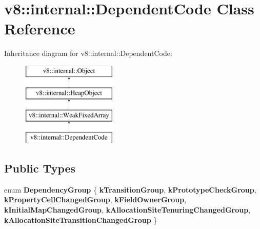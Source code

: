 \hypertarget{classv8_1_1internal_1_1DependentCode}{}\section{v8\+:\+:internal\+:\+:Dependent\+Code Class Reference}
\label{classv8_1_1internal_1_1DependentCode}
Inheritance diagram for v8\+:\+:internal\+:\+:Dependent\+Code\+:\begin{figure}[H]
\begin{center}
\leavevmode
\includegraphics[height=4.000000cm]{classv8_1_1internal_1_1DependentCode}
\end{center}
\end{figure}
\subsection*{Public Types}
\begin{DoxyCompactItemize}
\item 
\mbox{\label{classv8_1_1internal_1_1DependentCode_a6ddeb27b4e6f458ce2257036e3f364ae}} 
enum {\bfseries Dependency\+Group} \{ \newline
{\bfseries k\+Transition\+Group}, 
{\bfseries k\+Prototype\+Check\+Group}, 
{\bfseries k\+Property\+Cell\+Changed\+Group}, 
{\bfseries k\+Field\+Owner\+Group}, 
\newline
{\bfseries k\+Initial\+Map\+Changed\+Group}, 
{\bfseries k\+Allocation\+Site\+Tenuring\+Changed\+Group}, 
{\bfseries k\+Allocation\+Site\+Transition\+Changed\+Group}
 \}
\end{DoxyCompactItemize}
